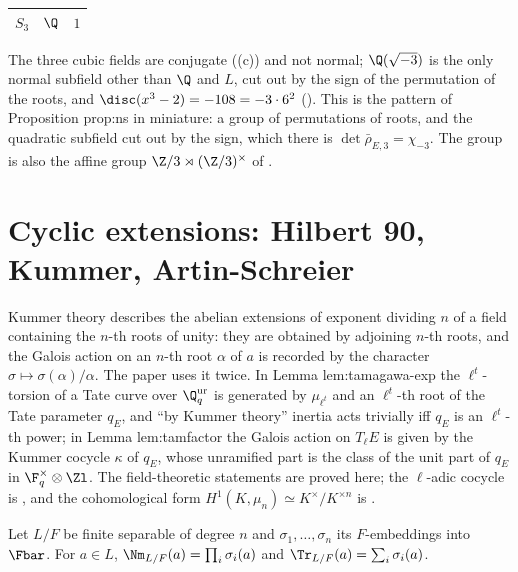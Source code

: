 \begin{example}
\begin{center}
\begin{tabular}{lll}
$S_3$ & $\Q$ & $1$\\
\bottomrule
\end{tabular}
\end{center}
The three cubic fields are conjugate ((c)) and not normal; $\Q(\sqrt{-3})$ is the only normal subfield other than $\Q$ and $L$, cut out by the sign of
the permutation of the roots, and $\disc(x^3-2)=-108=-3\cdot6^2$ (). This is the pattern of Proposition prop:ns in miniature: a
group of permutations of roots, and the quadratic subfield cut out by the sign, which there is $\det\bar\rho_{E,3}=\chi_{-3}$. The group is also the affine group
$\Z/3\rtimes(\Z/3)^\times$ of .
\end{example}

\section[Hilbert 90, Kummer theory, Artin-Schreier]{Cyclic extensions: Hilbert 90, Kummer, Artin-Schreier}\label{sec:galois:kummer}

Kummer theory describes the abelian extensions of exponent dividing $n$ of a field containing the $n$-th roots of unity: they are obtained by
adjoining $n$-th roots, and the Galois action on an $n$-th root $\alpha$ of $a$ is recorded by the character $\sigma\mapsto\sigma(\alpha)/\alpha$. The paper uses
it twice. In Lemma lem:tamagawa-exp the $\ell^t$-torsion of a Tate curve over $\Q_q^{\mathrm{ur}}$ is generated by $\mu_{\ell^t}$ and an $\ell^t$-th root of the Tate
parameter $q_E$, and ``by Kummer theory'' inertia acts trivially iff $q_E$ is an $\ell^t$-th power; in Lemma lem:tamfactor the Galois action on $T_\ell E$ is given by
the Kummer cocycle $\kappa$ of $q_E$, whose unramified part is the class of the unit part of $q_E$ in $\F_q^\times\otimes\Zl$. The field-theoretic statements are
proved here; the $\ell$-adic cocycle is , and the cohomological form $H^1(K,\mu_n)\simeq K^\times/K^{\times n}$ is .

\begin{definition}\label{def:galois:norm-trace}
Let $L/F$ be finite separable of degree $n$ and $\sigma_1,\dots,\sigma_n$ its $F$-embeddings into $\Fbar$. For $a\in L$,
$\Nm_{L/F}(a)=\prod_i\sigma_i(a)$ and $\Tr_{L/F}(a)=\sum_i\sigma_i(a)$.
\end{definition}

